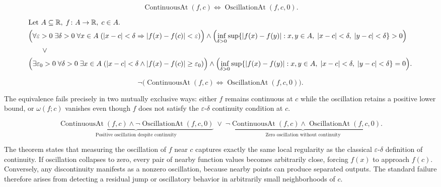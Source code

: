\begin{remark*}
\[
\operatorname{ContinuousAt}(f,c) \Longleftrightarrow \operatorname{OscillationAt}(f,c,0).
\]
\end{remark*}

\begin{remark*}
\[
\begin{aligned}
&\text{Let } A \subseteq \mathbb{R},\; f \colon A \to \mathbb{R},\; c \in A.\\
&\Bigl(\forall \varepsilon>0 \; \exists \delta>0 \; \forall x \in A \; (|x-c|<\delta \Rightarrow |f(x)-f(c)|<\varepsilon)\Bigr)
\land \Bigl(\inf_{\delta>0}\sup\{|f(x)-f(y)| : x,y \in A,\; |x-c|<\delta,\; |y-c|<\delta\}>0\Bigr)\\
&\qquad \lor\\
&\Bigl(\exists \varepsilon_0>0 \; \forall \delta>0 \; \exists x \in A \; (|x-c|<\delta \land |f(x)-f(c)| \ge \varepsilon_0)\Bigr)
\land \Bigl(\inf_{\delta>0}\sup\{|f(x)-f(y)| : x,y \in A,\; |x-c|<\delta,\; |y-c|<\delta\}=0\Bigr).
\end{aligned}
\]
\end{remark*}

\begin{remark*}
\[
\neg\bigl(\operatorname{ContinuousAt}(f,c) \Longleftrightarrow \operatorname{OscillationAt}(f,c,0)\bigr).
\]
\end{remark*}

\begin{remark*}
The equivalence fails precisely in two mutually exclusive ways: either $f$ remains continuous at $c$ while the oscillation retains a positive lower bound, or $\omega(f;c)$ vanishes even though $f$ does not satisfy the $\varepsilon$-$\delta$ continuity condition at $c$.
\end{remark*}

\begin{remark*}
\[
\underbrace{\operatorname{ContinuousAt}(f,c) \land \neg \operatorname{OscillationAt}(f,c,0)}_{\text{Positive oscillation despite continuity}}
\;\lor\;
\underbrace{\neg \operatorname{ContinuousAt}(f,c) \land \operatorname{OscillationAt}(f,c,0)}_{\text{Zero oscillation without continuity}}.
\]
\end{remark*}

\begin{remark*}[Interpretation]
The theorem states that measuring the oscillation of $f$ near $c$ captures exactly the same local regularity as the classical $\varepsilon$-$\delta$ definition of continuity. If oscillation collapses to zero, every pair of nearby function values becomes arbitrarily close, forcing $f(x)$ to approach $f(c)$. Conversely, any discontinuity manifests as a nonzero oscillation, because nearby points can produce separated outputs. The standard failure therefore arises from detecting a residual jump or oscillatory behavior in arbitrarily small neighborhoods of $c$.
\end{remark*}

